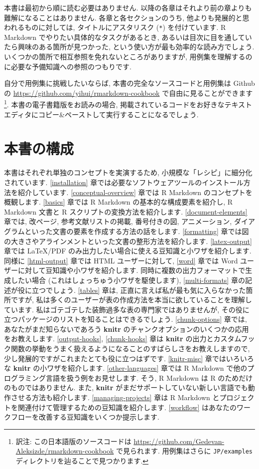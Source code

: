 \documentclass[
  11pt,
  lualatex,
  ja=standard]{bxjsreport}
\begin{document}
本書は最初から順に読む必要はありません. 以降の各章はそれより前の章よりも難解になることはありません. 各章と各セクションのうち, 他よりも発展的と思われるものに対しては, タイトルにアスタリスク (\texttt{*}) を付けています. R Markdown でやりたい具体的なタスクがあるとき, あるいは目次に目を通していたら興味のある箇所が見つかった, という使い方が最も効率的な読み方でしょう. いくつかの箇所で相互参照を免れないところがありますが, 用例集を理解するのに必要な予備知識への参照のつもりです.

自分で用例集に挑戦したいならば, 本書の完全なソースコードと用例集は Github の \url{https://github.com/yihui/rmarkdown-cookbook} で自由に見ることができます\footnote{訳注: この日本語版のソースコードは \url{https://github.com/Gedevan-Aleksizde/rmarkdown-cookbook} で見られます. 用例集はさらに \texttt{JP/examples} ディレクトリを辿ることで見つかります.}. 本書の電子書籍版をお読みの場合, 掲載されているコードをお好きなテキストエディタにコピー\&ペーストして実行することになるでしょう.

\hypertarget{Structure-of-the-book}{%
\section*{本書の構成}\label{Structure-of-the-book}}

本書はそれぞれ単独のコンセプトを実演するため, 小規模な「レシピ」に細分化されています. \ref{installation} 章では必要なソフトウェアツールのインストール方法を紹介しています. \ref{conceptual-overview} 章では R Markdown のコンセプトを概観します. \ref{basics} 章では R Markdown の基本的な構成要素を紹介し, R Markdown 文書と R スクリプトの変換方法を紹介します. \ref{document-elements} 章では, 改ページ, 参考文献リストの掲載, 番号付きの図, アニメーション, ダイアグラムといった文書の要素を作成する方法の話をします. \ref{formatting} 章では図の大きさやアラインメントといった文書の整形方法を紹介します. \ref{latex-output} 章では LaTeX/PDF のみ出力したい場合に使える豆知識と小ワザを紹介します. 同様に \ref{html-output} 章では HTML ユーザーに対して, \ref{word} 章では Word ユーザーに対して豆知識や小ワザを紹介します. 同時に複数の出力フォーマットで生成したい場合 (これはしょっちゅう小ワザを駆使します), \ref{multi-formats} 章の記述が役に立つでしょう. \ref{tables} 章は, 正直に言えば私が最も気に入らなかった箇所ですが, 私は多くのユーザーが表の作成方法を本当に欲していることを理解しています. 私はゴテゴテした装飾過多な表の専門家ではありませんが, その役に立つパッケージのリストを知ることはできるでしょう. \ref{chunk-options} 章では, あなたがまだ知らないであろう \textbf{knitr} のチャンクオプションのいくつかの応用をお教えします. \ref{output-hooks}, \ref{chunk-hooks} 章は \textbf{knitr} の出力とカスタムフック関数の挙動をうまく扱えるようになることのすばらしさをお教えしますので, 少し発展的ですがこれまたとても役に立つはずです. \ref{knitr-misc} 章ではいろいろな \textbf{knitr} の小ワザを紹介します. \ref{other-languages} 章では R Markdown で他のプログラミング言語を扱う例をお見せします. そう, R Markdown は R のためだけのものではありません. また, \textbf{knitr} がまだサポートしていない新しい言語でも動作させる方法も紹介します. \ref{managing-projects} 章は R Markdown とプロジェクトを関連付けて管理するための豆知識を紹介します. \ref{workflow} はあなたのワークフローを改善する豆知識をいくつか提示します.
\end{document}
